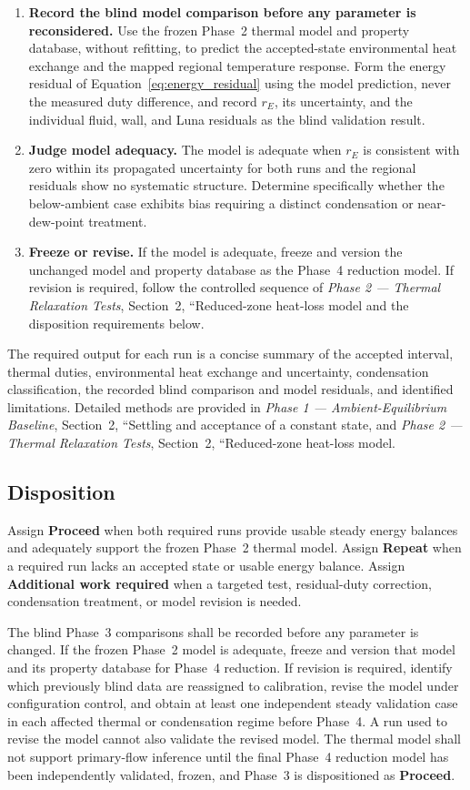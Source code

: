 \documentclass[11pt]{article}
\newcommand{\PhaseOneDoc}{\textit{Phase 1 --- Ambient-Equilibrium Baseline}}
\newcommand{\PhaseTwoDoc}{\textit{Phase 2 --- Thermal Relaxation Tests}}
\begin{document}
\begin{enumerate}
    \item \textbf{Record the blind model comparison before any parameter is reconsidered.} Use the frozen Phase~2 thermal model and property database, without refitting, to predict the accepted-state environmental heat exchange and the mapped regional temperature response. Form the energy residual of Equation~\eqref{eq:energy_residual} using the model prediction, never the measured duty difference, and record $r_E$, its uncertainty, and the individual fluid, wall, and Luna residuals as the blind validation result.

    \item \textbf{Judge model adequacy.} The model is adequate when $r_E$ is consistent with zero within its propagated uncertainty for both runs and the regional residuals show no systematic structure. Determine specifically whether the below-ambient case exhibits bias requiring a distinct condensation or near-dew-point treatment.

    \item \textbf{Freeze or revise.} If the model is adequate, freeze and version the unchanged model and property database as the Phase~4 reduction model. If revision is required, follow the controlled sequence of \PhaseTwoDoc, Section~2, ``Reduced-zone heat-loss model and the disposition requirements below.
\end{enumerate}

The required output for each run is a concise summary of the accepted interval, thermal duties, environmental heat exchange and uncertainty, condensation classification, the recorded blind comparison and model residuals, and identified limitations. Detailed methods are provided in \PhaseOneDoc, Section~2, ``Settling and acceptance of a constant state, and \PhaseTwoDoc, Section~2, ``Reduced-zone heat-loss model.


\subsection{Disposition}

Assign \textbf{Proceed} when both required runs provide usable steady energy balances and adequately support the frozen Phase~2 thermal model. Assign \textbf{Repeat} when a required run lacks an accepted state or usable energy balance. Assign \textbf{Additional work required} when a targeted test, residual-duty correction, condensation treatment, or model revision is needed.

The blind Phase~3 comparisons shall be recorded before any parameter is changed. If the frozen Phase~2 model is adequate, freeze and version that model and its property database for Phase~4 reduction. If revision is required, identify which previously blind data are reassigned to calibration, revise the model under configuration control, and obtain at least one independent steady validation case in each affected thermal or condensation regime before Phase~4. A run used to revise the model cannot also validate the revised model. The thermal model shall not support primary-flow inference until the final Phase~4 reduction model has been independently validated, frozen, and Phase~3 is dispositioned as \textbf{Proceed}.
\end{document}
